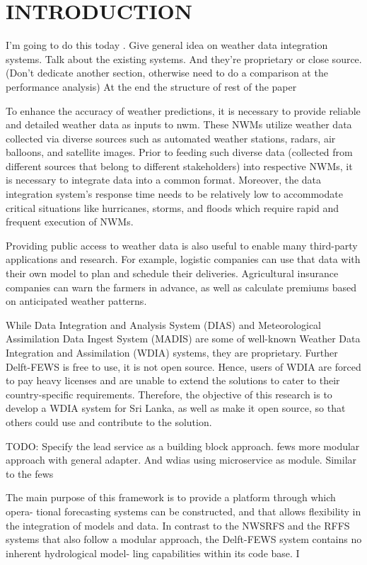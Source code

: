\documentclass[conference]{IEEEtran}
\begin{document}
\section{INTRODUCTION}
I'm going to do this today \cite{Haggett1998AnWales}.
Give general idea on weather data integration systems.
Talk about the existing systems. And they're proprietary or close source.
(Don't dedicate another section, otherwise need to do a comparison at the performance analysis)
At the end the structure of rest of the paper

To enhance the accuracy of weather predictions, it is necessary to provide reliable and detailed weather data as inputs to \acrfull{nwm}. These NWMs utilize weather data collected via diverse sources such as automated weather stations, radars, air balloons, and satellite images. Prior to feeding such diverse data (collected from different sources that belong to different stakeholders) into respective NWMs, it is necessary to integrate data into a common format. Moreover, the data integration system’s response time needs to be relatively low to accommodate critical situations like hurricanes, storms, and floods which require rapid and frequent execution of NWMs.

Providing public access to weather data is also useful to enable many third-party applications and research. For example, logistic companies can use that data with their own model to plan and schedule their deliveries. Agricultural insurance companies can warn the farmers in advance, as well as calculate premiums based on anticipated weather patterns.

While Data Integration and Analysis System (DIAS) and Meteorological Assimilation Data Ingest System (MADIS) are some of well-known Weather Data Integration and Assimilation (WDIA) systems, they are proprietary. Further Delft-FEWS is free to use, it is not open source. Hence, users of WDIA are forced to pay heavy licenses and are unable to extend the solutions to cater to their country-specific requirements. Therefore, the objective of this research is to develop a WDIA system for Sri Lanka, as well as make it open source, so that others could use and contribute to the solution.

TODO: Specify the \acrshort{lead} service as a building block approach. \acrshort{fews} more modular approach with general adapter. And \acrshort{wdias} using microservice as module.
Similar to the \acrfull{fews} \cite{WERNER2004DELFT-FEWS:SYSTEM} 

The main purpose of this framework is to provide a platform through which opera- tional forecasting systems can be constructed, and that allows flexibility in the integration of models and data. In contrast to the NWSRFS and the RFFS systems that also follow a modular approach, the Delft-FEWS system contains no inherent hydrological model- ling capabilities within its code base. I
\end{document}

